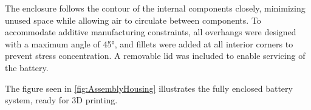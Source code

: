 The enclosure follows the contour of the internal components closely, minimizing unused space while allowing air to circulate between components. To accommodate additive manufacturing constraints, all overhangs were designed with a maximum angle of 45°, and fillets were added at all interior corners to prevent stress concentration. A removable lid was included to enable servicing of the battery.

The figure seen in  \ref{fig:AssemblyHousing} illustrates the fully enclosed battery system, ready for 3D printing.





